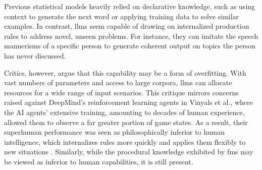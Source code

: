  \pskip

Previous statistical models heavily relied on declarative knowledge, such as using context to generate the next word or applying training data to solve similar examples. In contrast, \glspl{llm} seem capable of drawing on internalized production rules to address novel, unseen problems. For instance, they can imitate the speech mannerisms of a specific person to generate coherent output on topics the person has never discussed.

\pskip

Critics, however, argue that this capability may be a form of overfitting. With vast numbers of parameters and access to large corpora, \glspl{llm} can allocate resources for a wide range of input scenarios. This critique mirrors concerns raised against DeepMind's reinforcement learning agents in Vinyals et al., where the AI agents’ extensive training, amounting to decades of human experience, allowed them to observe a far greater portion of game states. As a result, their superhuman performance was seen as philosophically inferior to human intelligence, which internalizes rules more quickly and applies them flexibly to new situations \cite{Vinyals2019}. Similarly, while the procedural knowledge exhibited by \glspl{fm} may be viewed as inferior to human capabilities, it is still present.